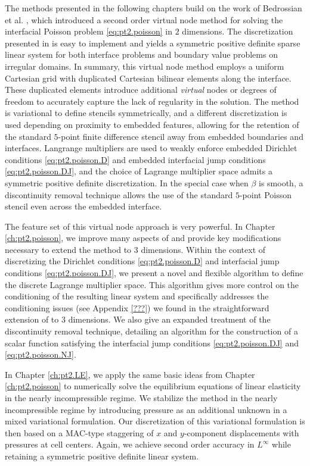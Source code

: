 The methods presented in the following chapters build on the work of Bedrossian et al. \cite{Bedrossian10}, which introduced a second order virtual node method for solving the interfacial Poisson problem \eqref{eq:pt2.poisson} in $2$ dimensions. The discretization presented in \cite{Bedrossian10} is easy to implement and yields a symmetric positive definite sparse linear system for both interface problems and boundary value problems on irregular domains. In summary, this virtual node method employs a uniform Cartesian grid with duplicated Cartesian bilinear elements along the interface. These duplicated elements introduce additional \emph{virtual} nodes or degrees of freedom to accurately capture the lack of regularity in the solution. The method is variational to define stencils symmetrically, and a different discretization is used depending on proximity to embedded features, allowing for the retention of the standard $5$-point finite difference stencil away from embedded boundaries and interfaces. Langrange multipliers are used to weakly enforce embedded Dirichlet conditions \eqref{eq:pt2.poisson.D} and embedded interfacial jump conditions \eqref{eq:pt2.poisson.DJ}, and the choice of Lagrange multiplier space admits a symmetric positive definite discretization. In the special case when $\beta$ is smooth, a discontinuity removal technique allows the use of the standard $5$-point Poisson stencil even across the embedded interface.

The feature set of this virtual node approach is very powerful. In Chapter \ref{ch:pt2.poisson}, we improve many aspects of \cite{Bedrossian10} and provide key modifications necessary to extend the method to $3$ dimensions. Within the context of discretizing the Dirichlet conditions \eqref{eq:pt2.poisson.D} and interfacial jump conditions \eqref{eq:pt2.poisson.DJ}, we present a novel and flexible algorithm to define the discrete Lagrange multiplier space. This algorithm gives more control on the conditioning of the resulting linear system and specifically addresses the conditioning issues (see Appendix \ref{???}) we found in the straightforward extension of \cite{Bedrossian10} to $3$ dimensions. We also give an expanded treatment of the discontinuity removal technique, detailing an algorithm for the construction of a scalar function satisfying the interfacial jump conditions \eqref{eq:pt2.poisson.DJ} and \eqref{eq:pt2.poisson.NJ}.

In Chapter \ref{ch:pt2.LE}, we apply the same basic ideas from Chapter \ref{ch:pt2.poisson} to numerically solve the equilibrium equations of linear elasticity in the nearly incompressible regime. We stabilize the method in the nearly incompressible regime by introducing pressure as an additional unknown in a mixed variational formulation. Our discretization of this variational formulation is then based on a MAC-type staggering of $x$ and $y$-component displacements with pressures at cell centers. Again, we achieve second order accuracy in $L^{\infty}$ while retaining a symmetric positive definite linear system.

